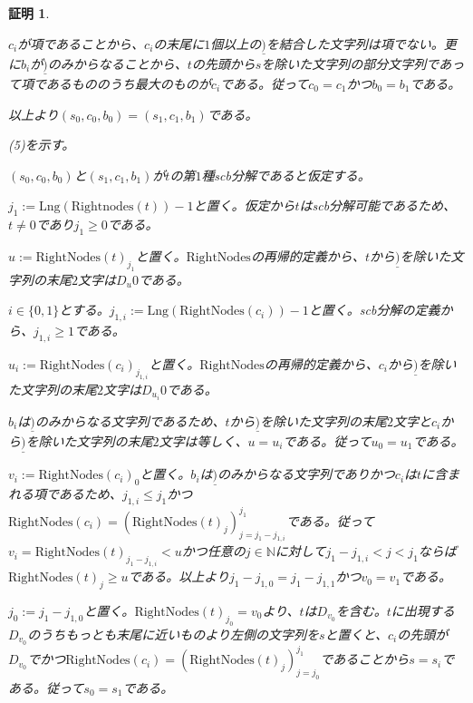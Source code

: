 \documentclass[dvipdfmx,uplatex]{jsarticle}
\theoremstyle{customnonumberbreakfortheorem}
\theoremstyle{customnonumberbreakforproof}
\newtheorem{hideableproof}{証明}
\begin{document}
\begin{hideableproof}
\begin{indented}
\begin{indented}
			\item \(c_i\)が項であることから、\(c_i\)の末尾に\(1\)個以上の\(\underline{)}\)を結合した文字列は項でない。更に\(b_i\)が\(\underline{)}\)のみからなることから、\(t\)の先頭から\(s\)を除いた文字列の部分文字列であって項であるもののうち最大のものが\(c_i\)である。従って\(c_0 = c_1\)かつ\(b_0 = b_1\)である。
			\item 以上より\((s_0,c_0,b_0) = (s_1,c_1,b_1)\)である。
		\end{indented}
		\item (5)を示す。
		\begin{indented}
			\item \((s_0,c_0,b_0)\)と\((s_1,c_1,b_1)\)が\(t\)の第\(1\)種scb分解であると仮定する。
			\item \(j_1 := \textrm{Lng}(\textrm{Rightnodes}(t))-1\)と置く。仮定から\(t\)はscb分解可能であるため、\(t \neq 0\)であり\(j_1 \geq 0\)である。
			\item \(u := \textrm{RightNodes}(t)_{j_1}\)と置く。\(\textrm{RightNodes}\)の再帰的定義から、\(t\)から\(\underline{)}\)を除いた文字列の末尾\(2\)文字は\(D_u 0\)である。
			\item \(i \in \{0,1\}\)とする。\(j_{1,i} := \textrm{Lng}(\textrm{RightNodes}(c_i))-1\)と置く。scb分解の定義から、\(j_{1,i} \geq 1\)である。
			\item \(u_i := \textrm{RightNodes}(c_i)_{j_{1,i}}\)と置く。\(\textrm{RightNodes}\)の再帰的定義から、\(c_i\)から\(\underline{)}\)を除いた文字列の末尾\(2\)文字は\(D_{u_i} 0\)である。
			\item \(b_i\)は\(\underline{)}\)のみからなる文字列であるため、\(t\)から\(\underline{)}\)を除いた文字列の末尾\(2\)文字と\(c_i\)から\(\underline{)}\)を除いた文字列の末尾\(2\)文字は等しく、\(u = u_i\)である。従って\(u_0 = u_1\)である。
			\item \(v_i := \textrm{RightNodes}(c_i)_0\)と置く。\(b_i\)は\(\underline{)}\)のみからなる文字列でありかつ\(c_i\)は\(t\)に含まれる項であるため、\(j_{1,i} \leq j_1\)かつ\(\textrm{RightNodes}(c_i) = (\textrm{RightNodes}(t)_j)_{j=j_1-j_{1,i}}^{j_1}\)である。従って\(v_i = \textrm{RightNodes}(t)_{j_1-j_{1,i}} < u\)かつ任意の\(j \in \mathbb{N}\)に対して\(j_1-j_{1,i} < j < j_1\)ならば\(\textrm{RightNodes}(t)_j \geq u\)である。以上より\(j_1-j_{1,0} = j_1-j_{1,1}\)かつ\(v_0 = v_1\)である。
			\item \(j_0 := j_1 - j_{1,0}\)と置く。\(\textrm{RightNodes}(t)_{j_0} = v_0\)より、\(t\)は\(D_{v_0}\)を含む。\(t\)に出現する\(D_{v_0}\)のうちもっとも末尾に近いものより左側の文字列を\(s\)と置くと、\(c_i\)の先頭が\(D_{v_0}\)でかつ\(\textrm{RightNodes}(c_i) = (\textrm{RightNodes}(t)_j)_{j=j_0}^{j_1}\)であることから\(s = s_i\)である。従って\(s_0 = s_1\)である。

\end{indented}
\end{indented}
\end{hideableproof}
\end{document}
